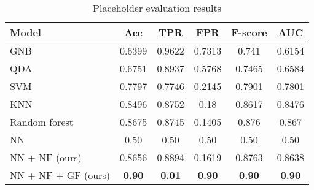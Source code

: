 \begin{table}[t]
\centering
\begin{tabular}{@{}lccccc@{}}
\toprule
\textbf{Model} & \textbf{Acc} & \textbf{TPR} & \textbf{FPR} & \textbf{F-score} & \textbf{AUC} \\ \midrule
GNB             & 0.6399 & 0.9622 & 0.7313 & 0.741  & 0.6154 \\
QDA             & 0.6751 & 0.8937 & 0.5768 & 0.7465 & 0.6584 \\
SVM             & 0.7797 & 0.7746 & 0.2145 & 0.7901 & 0.7801 \\
KNN             & 0.8496 & 0.8752 & 0.18   & 0.8617 & 0.8476 \\
Random forest   & 0.8675 & 0.8745 & 0.1405 & 0.876  & 0.867 \\
NN              & 0.50   & 0.50   & 0.50   & 0.50   & 0.50 \\ \midrule
NN + NF (ours)  & 0.8656 & 0.8894 & 0.1619 & 0.8763 & 0.8638 \\
NN + NF + GF (ours) & \textbf{0.90} & \textbf{0.01} & \textbf{0.90} & \textbf{0.90} & \textbf{0.90} \\ \bottomrule
\end{tabular}
\caption{Placeholder evaluation results}
\label{tab:results}
\end{table}